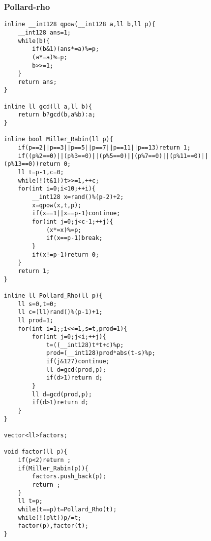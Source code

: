 \documentclass{ctexart}
\begin{document}
\subsubsection{Pollard-rho}
\begin{lstlisting}
inline __int128 qpow(__int128 a,ll b,ll p){
    __int128 ans=1;
    while(b){
        if(b&1)(ans*=a)%=p;
        (a*=a)%=p;
        b>>=1;
    }
    return ans;
}

inline ll gcd(ll a,ll b){
    return b?gcd(b,a%b):a;
}

inline bool Miller_Rabin(ll p){
    if(p==2||p==3||p==5||p==7||p==11||p==13)return 1;
    if((p%2==0)||(p%3==0)||(p%5==0)||(p%7==0)||(p%11==0)||(p%13==0))return 0;
    ll t=p-1,c=0;
    while(!(t&1))t>>=1,++c;
    for(int i=0;i<10;++i){
        __int128 x=rand()%(p-2)+2;
        x=qpow(x,t,p);
        if(x==1||x==p-1)continue;
        for(int j=0;j<c-1;++j){
            (x*=x)%=p;
            if(x==p-1)break;
        }
        if(x!=p-1)return 0;
    }
    return 1;
}

inline ll Pollard_Rho(ll p){
    ll s=0,t=0;
    ll c=(ll)rand()%(p-1)+1;
    ll prod=1;
    for(int i=1;;i<<=1,s=t,prod=1){
        for(int j=0;j<i;++j){
            t=((__int128)t*t+c)%p;
            prod=(__int128)prod*abs(t-s)%p;
            if(j&127)continue;
            ll d=gcd(prod,p);
            if(d>1)return d;
        }
        ll d=gcd(prod,p);
        if(d>1)return d;
    }
}

vector<ll>factors;

void factor(ll p){
    if(p<2)return ;
    if(Miller_Rabin(p)){
        factors.push_back(p);
        return ;
    }
    ll t=p;
    while(t==p)t=Pollard_Rho(t);
    while(!(p%t))p/=t;
    factor(p),factor(t);
}
\end{lstlisting}
\end{document}

